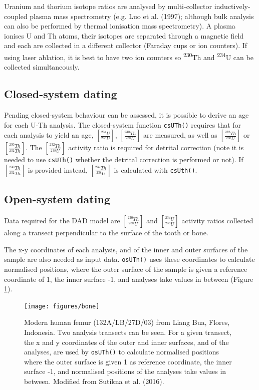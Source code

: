 \documentclass[]{elsarticle} %
\begin{document}
Uranium and thorium isotope ratios are analysed by multi-collector inductively-coupled plasma mass spectrometry (e.g. Luo et al. (1997); although bulk analysis can also be performed by thermal ionisation mass spectrometry). A plasma ionises U and Th atoms, their isotopes are separated through a magnetic field and each are collected in a different collector (Faraday cups or ion counters). If using laser ablation, it is best to have two ion counters so \textsuperscript{230}Th and \textsuperscript{234}U can be collected simultaneously.

\hypertarget{closed-system-dating}{%
\subsection{Closed-system dating}\label{closed-system-dating}}

Pending closed-system behaviour can be assessed, it is possible to derive an age for each U-Th analysis.
The closed-system function \texttt{csUTh()} requires that for each analysis to yield an age, \([\frac{^{234}U}{^{238}U}]\), \([\frac{^{230}Th}{^{238}U}]\) are measured, as well as \([\frac{^{232}Th}{^{238}U}]\) or \([\frac{^{230}Th}{^{232}Th}]\). The \([\frac{^{232}Th}{^{238}U}]\) activity ratio is required for detrital correction (note it is needed to use \texttt{csUTh()} whether the detrital correction is performed or not). If \([\frac{^{230}Th}{^{232}Th}]\) is provided instead, \([\frac{^{232}Th}{^{238}U}]\) is calculated with \texttt{csUth()}.

\hypertarget{open-system-dating}{%
\subsection{Open-system dating}\label{open-system-dating}}

Data required for the DAD model are \([\frac{^{230}Th}{^{238}U}]\) and \([\frac{^{234}U}{^{238}U}]\) activity ratios collected along a transect perpendicular to the surface of the tooth or bone.

The x-y coordinates of each analysis, and of the inner and outer surfaces of the sample are also needed as input data. \texttt{osUTh()} uses these coordinates to calculate normalised positions, where the outer surface of the sample is given a reference coordinate of 1, the inner surface -1, and analyses take values in between (Figure \ref{fig:femurpic}).



\begin{figure}
\texttt{[image: figures/bone]} \caption{Modern human femur (132A/LB/27D/03) from Liang Bua, Flores, Indonesia. Two analysis transects can be seen. For a given transect, the x and y coordinates of the outer and inner surfaces, and of the analyses, are used by \texttt{osUTh()} to calculate normalised positions where the outer surface is given 1 as reference coordinate, the inner surface -1, and normalised positions of the analyses take values in between. Modified from Sutikna et al. (2016).}\label{fig:femurpic}
\end{figure}
\end{document}
